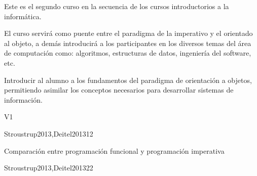 \begin{syllabus}


\begin{justification}
Este es el segundo curso en la secuencia de los cursos introductorios a la informática.

El curso servirá como puente entre el paradigma de la imperativo y el orientado al objeto, a demás introducirá a los participantes en los diversos temas del área de computación como: algoritmos, estructuras de datos, ingeniería del software, etc.
\end{justification}

\begin{goals}
\item Introducir al alumno a los fundamentos del paradigma de
      orientación a objetos, permitiendo asimilar los conceptos
      necesarios para desarrollar  sistemas de información.
\end{goals}

\begin{outcomes}{V1}
\end{outcomes}

\begin{unit}{\PLOverviewDef}{}{Stroustrup2013,Deitel2013}{1}{2}
   \begin{topics}
      \item \PLOverviewTopicBrief
      \item Comparación entre programación funcional y programación imperativa
      \item \PLOverviewTopicHistory
   \end{topics}

   \begin{learningoutcomes}
      \item \PLOverviewObjONE
      \item \PLOverviewObjTWO
      \item \PLOverviewObjTHREE
   \end{learningoutcomes}
\end{unit}

\begin{unit}{\PLVirtualMachinesDef}{}{Stroustrup2013,Deitel2013}{2}{2}
   \begin{topics}
      \item \PLVirtualMachinesTopicETheconcept%
      \item \PLVirtualMachinesTopicHierarchy%
      \item \PLVirtualMachinesTopicIntermediate%
   \end{topics}


\end{unit}
\end{syllabus}
